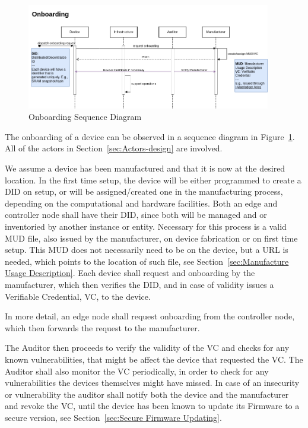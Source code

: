 \label{sec:Onboarding}
\begin{figure}
	\begin{center}
		\includegraphics[width=0.95\textwidth]{figures/onboarding-sequence-diagram.png}
	\end{center}
	\caption{Onboarding Sequence Diagram}
	\label{fig:onboarding-sequence-diagram}
\end{figure}

The onboarding of a device can be observed in a sequence diagram in Figure~\ref{fig:onboarding-sequence-diagram}.
All of the actors in Section~\ref{sec:Actors-design} are involved.

We assume a device has been manufactured and that it is now at the desired location. In the first time setup, the device
will be either programmed to create a DID on setup, or will be assigned/created one in the manufacturing process,
depending on the computational and hardware facilities. Both an edge and controller node shall have their DID, since
both will be managed and or inventoried by another instance or entity.
Necessary for this process is a valid MUD file, also issued by the manufacturer, on device fabrication or on first time
setup. This MUD does not necessarily need to be on the device, but a URL is needed, which points to the location of such
file, see Section~\ref{sec:Manufacture Usage Description}.
Each device shall request and onboarding by the manufacturer, which then verifies the DID, and in case of validity
issues a Verifiable Credential, VC, to the device.

In more detail, an edge node shall request onboarding from the controller node, which then forwards the request to the
manufacturer.

The Auditor then proceeds to verify the validity of the VC and checks for any known vulnerabilities, that might be
affect the device that requested the VC. The Auditor shall also monitor the VC periodically, in order to check for any
vulnerabilities the devices themselves might have missed. In case of an insecurity or vulnerability the auditor shall
notify both the device and the manufacturer and revoke the VC, until the device has been known to update its Firmware to
a secure version, see Section~\ref{sec:Secure Firmware Updating}.

